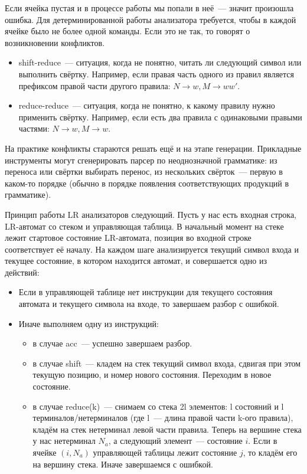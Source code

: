 Если ячейка пустая и в процессе работы мы попали в неё~--- значит произошла ошибка. Для детерминированной работы анализатора требуется, чтобы в каждой ячейке было не более одной команды. Если это не так, то говорят о возникновении конфликтов.

\begin{itemize}
\item shift-reduce~--- ситуация, когда не понятно, читать ли следующий символ или выполнить свёртку. Например, если правая часть одного из правил является префиксом правой части другого правила: $N \rightarrow w, M \rightarrow ww'$.
\item reduce-reduce~--- ситуация, когда не понятно, к какому правилу нужно применить свёртку.
Например, если есть два правила с одинаковыми правыми частями: $N \rightarrow w, M \rightarrow w$.
\end{itemize}

На практике конфликты стараются решать ещё и на этапе генерации.
Прикладные инструменты могут сгенерировать парсер по неоднозначной грамматике: из переноса или свёртки выбирать перенос, из нескольких свёрток~--- первую в каком-то порядке (обычно в порядке появления соответствующих продукций в грамматике).

Принцип работы LR анализаторов следующий. Пусть у нас есть входная строка, LR-автомат со стеком и управляющая таблица.
В начальный момент на стеке лежит стартовое состояние LR-автомата, позиция во входной строке соответствует её началу.
На каждом шаге анализируется текущий символ входа и текущее состояние, в котором находится автомат, и совершается одно из действий:
\begin{itemize}
\item Если в управляющей таблице нет инструкции для текущего состояния автомата и текущего символа на входе, то завершаем разбор с ошибкой.
\item Иначе выполняем одну из инструкций:
\begin{itemize}
\item в случае acc~--- успешно завершаем разбор.
\item в случае shift~--- кладем на стек текущий символ входа, сдвигая при этом текущую позицию, и номер нового состояния. Переходим в новое состояние.
\item в случае reduce(k)~--- снимаем со стека 2l элементов: l состояний и l терминалов/нетерминалов (где l~--- длина правой части k-ого правила), кладём на стек нетерминал левой части правила. Теперь на вершине стека у нас нетерминал $N_a$, а следующий элемент~--- состояние $i$. Если в ячейке $(i,N_a)$ управляющей таблицы лежит состояние $j$, то кладём его на вершину стека. Иначе завершаемся с ошибкой.
\end{itemize}
\end{itemize}


